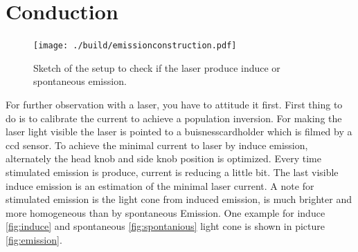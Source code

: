 \section{Conduction}%
\label{sec:conduction}
\begin{figure}
		\centering
		\texttt{[image: ./build/emissionconstruction.pdf]}
		\caption{Sketch of the setup to check if the laser produce induce or
		spontaneous emission. \cite{anleitung}}
		\label{fig:aufbau}
\end{figure}
For further observation with a laser, you have to attitude it first. 
First thing to do is to calibrate the current to achieve a population inversion. 
For making the laser light visible the laser is pointed to a buisnesscardholder
which is filmed by a ccd sensor.
To achieve the minimal current to laser by induce emission, alternately the head
knob and side knob position is optimized.
Every time stimulated emission is produce, current is reducing a
little bit. 
The last visible induce emission is an estimation of the minimal laser current.
A note for stimulated emission is the light cone from induced emission, is
much brighter and more homogeneous than by spontaneous Emission.
One example for induce \ref{fig:induce} and spontaneous \ref{fig:spontanious} light cone is shown in picture \ref{fig:emission}.
